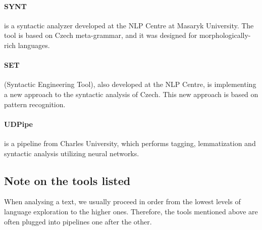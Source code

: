 \paragraph{SYNT} is a syntactic analyzer developed at the NLP Centre at Masaryk University. The tool is based on Czech meta-grammar, and it was designed for morphologically-rich languages.

\paragraph{SET} (Syntactic Engineering Tool), also developed at the NLP Centre, is implementing a new approach to the syntactic analysis of Czech. This new approach is based on pattern recognition. \cite{set}

\paragraph{UDPipe} is a pipeline from Charles University, which performs tagging, lemmatization and syntactic analysis utilizing neural networks. \cite{straka-2018-udpipe}

\subsection*{Note on the tools listed}

When analysing a text, we usually proceed in order from the lowest levels of language exploration to the higher ones. Therefore, the tools mentioned above are often plugged into pipelines one after the other.

